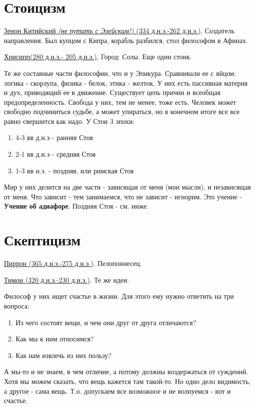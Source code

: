\section{Стоицизм}
\hspace{8pt} 
\underline{Зенон Китийский \textit{(не путать с Элейским!)} (334 д.н.э.-262 д.н.э.)}. Создатель направления. Был купцом с Кипра, корабль разбился, стол философом в Афинах. 

\underline{Хрисипп(280 д.н.э.- 205 д.н.э.)}. Город: Солы. Еще один стоик.

Те же составные части философии, что и у Эпикура. Сравнивали ее с яйцом: логика - скорлупа, физика - белок, этика - желток.
У них есть пассивная материя и дух, приводящий ее в движение. Существует цепь причин и всеобщая предопределенность. Свобода у них, тем не менее, тоже есть. Человек может свободно подчиниться судьбе, а может упираться, но в конечном итоге все все равно свершится как надо. У Стои 3 эпохи:
\begin{enumerate}
\item 4-3 вв д.н.э - ранняя Стоя
\item 2-1 вв д.н.э - средняя Стоя
\item 1-3 вв н.э. - поздняя, или римская Стоя
\end{enumerate}
Мир у них делится на две части - зависящая от меня (мои мысли), и независящая от меня.
Что зависит - тем занимаемся, что не зависит - игнорим. Это учение - \textbf{Учение об адиафоре}.
Поздняя Стоя - см. ниже.

\section{Скептицизм}
\hspace{8pt} 
\underline{Пиррон (365 д.н.э.-275 д.н.э.)}. Пелопоннесец.

\underline{Тимон (320 д.н.э.-230 д.н.э.)}. Те же идеи.

Философ у них ищет счастье в жизни. Для этого ему нужно ответить на три вопроса:
\begin{enumerate}
\item Из чего состоят вещи, и чем они друг от друга отличаются?
\item Как мы к ним относимся?
\item Как нам извлечь из них пользу?
\end{enumerate}
А мы-то и не знаем, в чем отличие, а потому должны воздержаться от суждений. Хотя мы можем сказать, что вещь кажется там такой-то. Но одно дело видимость, а другое - сама вещь. Т.о. допускаем все возможное и не волнуемся - вот и счастье.

